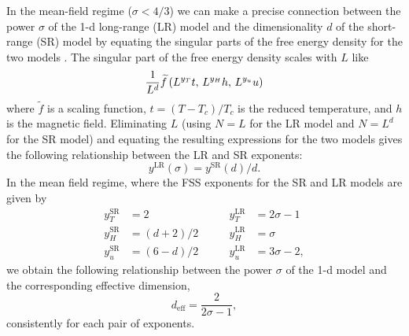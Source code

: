 In the mean-field regime ($\sigma<4/3$) we can make a precise connection
between the power $\sigma$ of the 1-d long-range (LR) model and the
dimensionality $d$ of the short-range (SR) model by equating the singular parts
of the free energy density for the two models \autocite{larson2010numerical}.
The singular part of the free energy density scales with $L$ like
\begin{equation}
  \frac{1}{L^d} \widetilde{f} \left(L^{y_T} t,\, L^{y_H} h,\, L^{y_u} u\right)
\end{equation}
where $\widetilde{f}$ is a scaling function, $t=(T-T_c)/T_c$ is the reduced
temperature, and $h$ is the magnetic field. Eliminating $L$ (using $N=L$ for
the LR model and $N=L^d$ for the SR model) and equating the resulting
expressions for the two models gives the following relationship between the LR
and SR exponents:
\begin{equation}
  y^{\mathrm{LR}}(\sigma) = y^{\mathrm{SR}}(d)/d.
\end{equation}
In the mean field regime, where the FSS exponents for the SR and LR models are
given by
\begin{equation*}
  \begin{split}
    y_T^{\mathrm{SR}} &= 2 \\
    y_H^{\mathrm{SR}} &= (d+2)/2 \\
    y_u^{\mathrm{SR}} &= (6-d)/2
  \end{split}
  \qquad
  \begin{split}
    y_T^{\mathrm{LR}} &= 2\sigma - 1 \\
    y_H^{\mathrm{LR}} &= \sigma \\
    y_u^{\mathrm{LR}} &= 3\sigma - 2,
  \end{split}
\end{equation*}
\autocite{harris1976critical,kotliar1983one}
we obtain the following relationship between the power $\sigma$ of the 1-d
model and the corresponding effective dimension,
\begin{equation}
  d_{\mathrm{eff}} = \frac{2}{2\sigma - 1},
\end{equation}
consistently for each pair of exponents.

